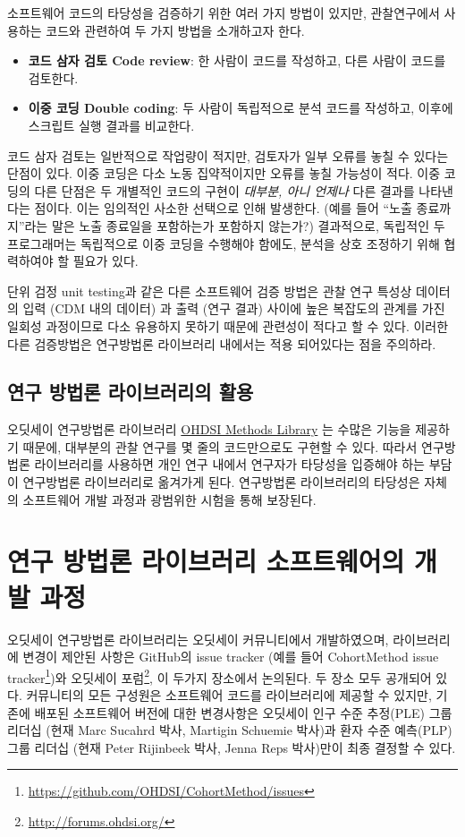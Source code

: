 \documentclass[10.5pt]{book}
\providecommand{\tightlist}{%
  \setlength{\itemsep}{0pt}\setlength{\parskip}{0pt}}
\let\rmarkdownfootnote\footnote%
\def\footnote{\protect\rmarkdownfootnote}
\theoremstyle{definition}
\theoremstyle{definition}
\theoremstyle{definition}
\theoremstyle{remark}
\begin{document}
소프트웨어 코드의 타당성을 검증하기 위한 여러 가지 방법이 있지만,
관찰연구에서 사용하는 코드와 관련하여 두 가지 방법을 소개하고자 한다.

\begin{itemize}
\tightlist
\item
  \textbf{코드 삼자 검토 Code review}: 한 사람이 코드를 작성하고, 다른
  사람이 코드를 검토한다.
\item
  \textbf{이중 코딩 Double coding}: 두 사람이 독립적으로 분석 코드를
  작성하고, 이후에 스크립트 실행 결과를 비교한다.
\end{itemize}

코드 삼자 검토는 일반적으로 작업량이 적지만, 검토자가 일부 오류를 놓칠
수 있다는 단점이 있다. 이중 코딩은 다소 노동 집약적이지만 오류를 놓칠
가능성이 적다. 이중 코딩의 다른 단점은 두 개별적인 코드의 구현이
\emph{대부분, 아니 언제나} 다른 결과를 나타낸다는 점이다. 이는 임의적인
사소한 선택으로 인해 발생한다. (예를 들어 ``노출 종료까지''라는 말은
노출 종료일을 포함하는가 포함하지 않는가?) 결과적으로, 독립적인 두
프로그래머는 독립적으로 이중 코딩을 수행해야 함에도, 분석을 상호
조정하기 위해 협력하여야 할 필요가 있다.

단위 검정 unit testing과 같은 다른 소프트웨어 검증 방법은 관찰 연구
특성상 데이터의 입력 (CDM 내의 데이터) 과 출력 (연구 결과) 사이에 높은
복잡도의 관계를 가진 일회성 과정이므로 다소 유용하지 못하기 때문에
관련성이 적다고 할 수 있다. 이러한 다른 검증방법은 연구방법론 라이브러리
내에서는 적용 되어있다는 점을 주의하라.

\subsection{연구 방법론 라이브러리의 활용}\label{---}

오딧세이 연구방법론 라이브러리
\href{https://ohdsi.github.io/MethodsLibrary/}{OHDSI Methods Library} 는
수많은 기능을 제공하기 때문에, 대부분의 관찰 연구를 몇 줄의 코드만으로도
구현할 수 있다. 따라서 연구방법론 라이브러리를 사용하면 개인 연구 내에서
연구자가 타당성을 입증해야 하는 부담이 연구방법론 라이브러리로 옮겨가게
된다. 연구방법론 라이브러리의 타당성은 자체의 소프트웨어 개발 과정과
광범위한 시험을 통해 보장된다.

\section{연구 방법론 라이브러리 소프트웨어의 개발 과정}\label{-----}

오딧세이 연구방법론 라이브러리는 오딧세이 커뮤니티에서 개발하였으며,
라이브러리에 변경이 제안된 사항은 GitHub의 issue tracker (예를 들어
CohortMethod issue tracker\footnote{\url{https://github.com/OHDSI/CohortMethod/issues}})와
오딧세이 포럼\footnote{\url{http://forums.ohdsi.org/}}, 이 두가지
장소에서 논의된다. 두 장소 모두 공개되어 있다. 커뮤니티의 모든 구성원은
소프트웨어 코드를 라이브러리에 제공할 수 있지만, 기존에 배포된
소프트웨어 버전에 대한 변경사항은 오딧세이 인구 수준 추정(PLE) 그룹
리더십 (현재 Marc Sucahrd 박사, Martigin Schuemie 박사)과 환자 수준
예측(PLP) 그룹 리더십 (현재 Peter Rijinbeek 박사, Jenna Reps 박사)만이
최종 결정할 수 있다.
\end{document}
